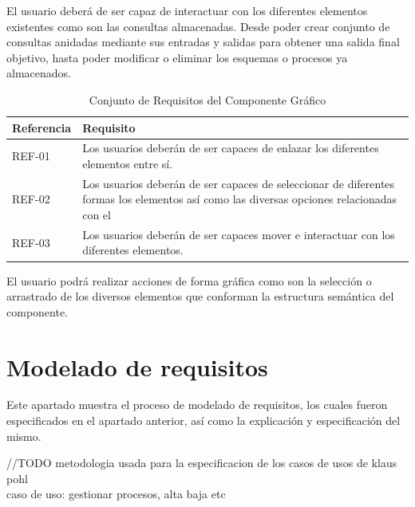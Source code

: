 \documentclass[a4paper,12pt]{book}
\begin{document}
		\vspace{5mm}

		El usuario deberá de ser capaz de interactuar con los diferentes elementos existentes como son las consultas almacenadas. Desde poder crear conjunto de consultas anidadas mediante sus entradas y salidas para obtener una salida final objetivo, hasta poder modificar o eliminar los esquemas o procesos ya almacenados.
	
	
		\begin{table}[H]
			\begin{center}
				\begin{tabular}{|l|l|}
					\hline
					Referencia & Requisito \\
					\hline \hline
					REF-01 & Los usuarios deberán de ser capaces de enlazar los diferentes elementos entre sí. \\ \hline					
					REF-02 & Los usuarios deberán de ser capaces de seleccionar de diferentes formas los elementos así como las diversas opciones relacionadas con el \\ \hline					
					REF-03 & Los usuarios deberán de ser capaces mover e interactuar con los diferentes elementos.\\ \hline
				\end{tabular}
				\caption{Conjunto de Requisitos del Componente Gráfico}
				\label{tabla:requisitosHerramientaProceso}
			\end{center}
		\end{table}
	
		\vspace{5mm}
	
		El usuario podrá realizar acciones de forma gráfica como son la selección o arrastrado de los diversos elementos que conforman la estructura semántica del componente.
	
	
		
		
		
	
	
		\section{Modelado de requisitos}
	Este apartado muestra el proceso de modelado de requisitos, los cuales fueron especificados en el apartado anterior, así como la explicación y especificación del mismo.
	
	//TODO
	metodologia usada para la especificacion de los casos de usos de klaus pohl\\
	
	caso de uso: gestionar procesos, alta baja etc
\end{document}
